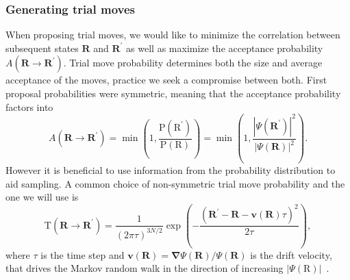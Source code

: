 \documentclass[final,3p,times,twocolumn]{elsarticle}
\begin{document}
	\subsubsection{Generating trial moves}
	When proposing trial moves, we would like to minimize the correlation between subsequent states $\mathbf{R}$ and $\mathbf{R}^\prime$ as well as maximize the acceptance probability $A(\mathbf{R} \rightarrow \mathbf{R}^{\prime})$. Trial move probability determines both the size and average acceptance of the moves, practice we seek a compromise between both. First proposal probabilities were symmetric, meaning that the acceptance probability factors into
	\begin{equation}
		A\left(\mathbf{R} \rightarrow \mathbf{R}^{\prime}\right)=\min \left(1, \frac{\mathrm{P}(\mathrm{R}^{\prime})}{\mathrm{P}(\mathrm{R})}\right) = \min\left(1, \frac{|\Psi(\mathbf{R}^\prime)|^2}{|\Psi(\mathbf{R})|^2}\right).
	\end{equation}
	However it is beneficial to use information from the probability distribution to aid sampling. A common choice of non-symmetric trial move probability and the one we will use is 
	\begin{equation}
		\mathrm{T}\left(\mathbf{R} \rightarrow \mathbf{R}^{\prime}\right) = \frac{1}{(2 \pi \tau)^{3 N / 2}}\exp\left({-} \frac{\left(\mathbf{R}^{\prime}-\mathbf{R}-\mathbf{v}\left(\mathbf{R}\right) \tau\right)^{2}}{2 \tau}\right),
	\end{equation}
	where $\tau$ is the time step and $\mathbf{v}(\mathbf{R})=\boldsymbol{\nabla} \Psi(\mathbf{R}) / \Psi(\mathbf{R})$ is the drift velocity, that drives the Markov random walk in the direction of increasing $|\Psi(\mathrm{R})|$~\cite{gubernatis_kawashima_werner_2016}.
	
\end{document}
